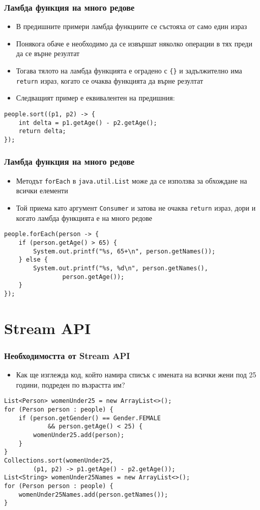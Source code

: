 \documentclass[ignorenonframetext, hyperref=unicode,compress,pdflatex]{beamer}
\begin{document}
\begin{frame}[containsverbatim]\frametitle{Ламбда функция на много редове}
\begin{itemize}
  \item В предишните примери ламбда функциите се състояха от само един израз
  \item Понякога обаче е необходимо да се извършат няколко операции в тях преди
  да се върне резултат
  \item Тогава тялото на ламбда функцията е оградено с
  \lstinline[mathescape]!{}! и задължително има \lstinline{return} израз, когато
  се очаква функцията да върне резултат
  \item Следващият пример е еквивалентен на предишния:
\end{itemize}
\begin{lstlisting}
people.sort((p1, p2) -> {
	int delta = p1.getAge() - p2.getAge();
	return delta;
});
\end{lstlisting}
\end{frame}

\begin{frame}[containsverbatim]\frametitle{Ламбда функция на много редове}
\begin{itemize}
  \item Методът \lstinline{forEach} в \lstinline{java.util.List} може да се
  използва за обхождане на всички елементи
  \item Той приема като аргумент \lstinline{Consumer} и затова не очаква
  \lstinline{return} израз, дори и когато ламбда функцията е на много редове
\end{itemize}
\begin{lstlisting}
people.forEach(person -> {
	if (person.getAge() > 65) {
		System.out.printf("%s, 65+\n", person.getNames());
	} else {
		System.out.printf("%s, %d\n", person.getNames(),
				person.getAge());
	}
});
\end{lstlisting}
\end{frame}

\section{Stream API}

\begin{frame}[containsverbatim]\frametitle{Необходимостта от Stream API}
\begin{itemize}
  \item Как ще изглежда код, който намира списък с имената на всички жени под
  25 години, подреден по възрастта им?
\end{itemize}
\begin{lstlisting}
List<Person> womenUnder25 = new ArrayList<>();
for (Person person : people) {
	if (person.getGender() == Gender.FEMALE
			&& person.getAge() < 25) {
		womenUnder25.add(person);
	}
}
Collections.sort(womenUnder25,
		(p1, p2) -> p1.getAge() - p2.getAge());
List<String> womenUnder25Names = new ArrayList<>();
for (Person person : people) {
	womenUnder25Names.add(person.getNames());
}
\end{lstlisting}
\end{frame}
\end{document}
